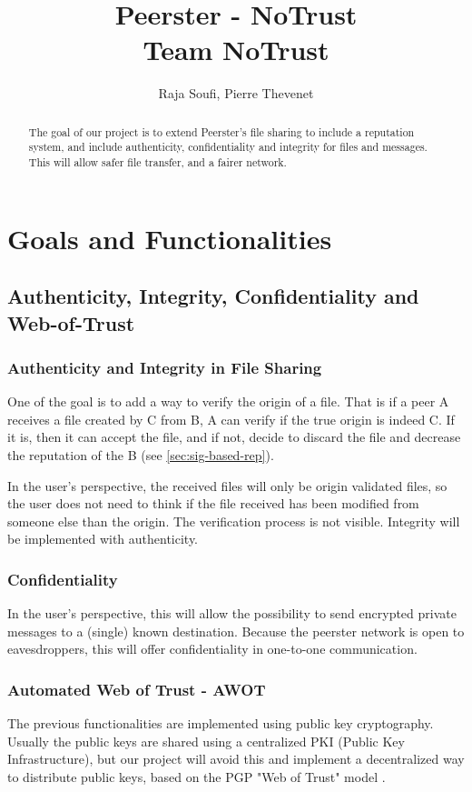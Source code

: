 \documentclass[]{article}
\title{Peerster - NoTrust\\
\large Team NoTrust}
\author{Raja Soufi, Pierre Thevenet}
\begin{document}
\maketitle

\begin{abstract}
The goal of our project is to extend Peerster's file sharing to include a reputation system, and include authenticity, confidentiality and integrity for files and messages. This will allow safer file transfer, and a fairer network.
\end{abstract}

\section{Goals and Functionalities}


\subsection{Authenticity, Integrity, Confidentiality and Web-of-Trust}

\subsubsection{Authenticity and Integrity in File Sharing}
\label{sec:goals-funcs-auth-integrity}
One of the goal is to add a way to verify the origin of a file. That is if a peer A receives a file created by C from B, A can verify if the true origin is indeed C. If it is, then it can accept the file, and if not, decide to discard the file and decrease the reputation of the B (see \ref{sec:sig-based-rep}). \newline

In the user's perspective, the received files will only be origin validated files, so the user does not need to think if the file received has been modified from someone else than the origin. The verification process is not visible.
Integrity will be implemented with authenticity.

\subsubsection{Confidentiality}
In the user's perspective, this will allow the possibility to send encrypted private messages to a (single) known destination. Because the peerster network is open to eavesdroppers, this will offer confidentiality in one-to-one communication.

\subsubsection{Automated Web of Trust - AWOT} 
The previous functionalities are implemented using public key cryptography. Usually the public keys are shared using a centralized PKI (Public Key Infrastructure), but our project will avoid this and implement a decentralized way to distribute public keys, based on the PGP "Web of Trust" model \cite{abdul1997pgp}.
\end{document}
